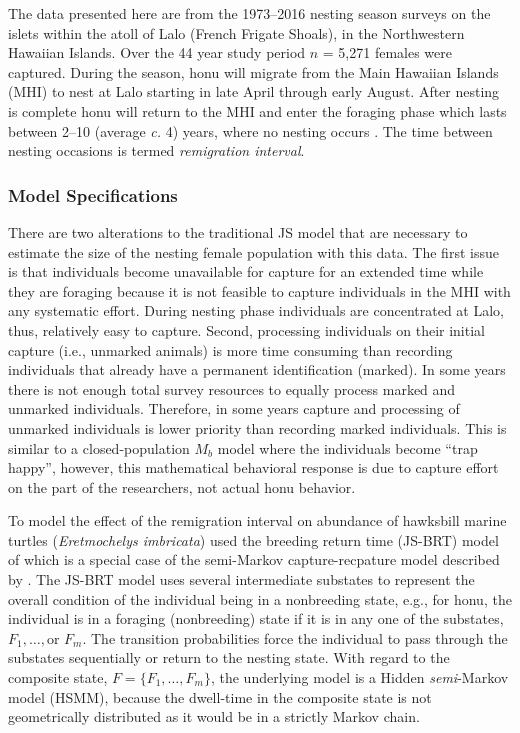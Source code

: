 \documentclass[12pt]{article}
\begin{document}
The data presented here are from the 1973--2016 nesting season surveys on the islets within the atoll of Lalo (French Frigate Shoals), in the Northwestern Hawaiian Islands. Over the 44 year study period $n$ = 5,271 females were captured. During the season, honu will migrate from the Main Hawaiian Islands (MHI) to nest at Lalo starting in late April through early August. After nesting is complete honu will return to the MHI and enter the foraging phase which lasts between 2--10 (average {\it c.} 4) years, where no nesting occurs \citep{BalazsEtAl2015a}. The time between nesting occasions is termed {\it remigration interval}. 


\subsubsection{Model Specifications}

There are two alterations to the traditional JS model that are necessary to estimate the size of the nesting female population with this data. The first issue is that individuals become unavailable for capture for an extended time while they are foraging because it is not feasible to capture individuals in the MHI with any systematic effort. During nesting phase individuals are concentrated at Lalo, thus, relatively easy to capture. Second, processing individuals on their initial capture (i.e., unmarked animals) is more time consuming than recording individuals that already have a permanent identification (marked). In some years there is not enough total survey resources to equally process marked and unmarked individuals. Therefore, in some years capture and processing of unmarked individuals is lower priority than recording marked individuals. This is similar to a closed-population $M_b$ model \citep{OtisEtAl1978a} where the individuals become ``trap happy'', however, this mathematical behavioral response is due to capture effort on the part of the researchers, not actual honu behavior.

To model the effect of the remigration interval on abundance of hawksbill marine turtles ({\it Eretmochelys imbricata}) \citet{kendall2019multistate} used the breeding return time (JS-BRT) model of \cite{PledgerEtAl2013a} which is a special case of the semi-Markov capture-recpature model described by \cite{king2016semi}. The JS-BRT model uses several intermediate substates to represent the overall condition of the individual being in a nonbreeding state, e.g., for honu, the individual is in a foraging (nonbreeding) state if it is in any one of the substates, $F_1,\dots, \text{or } F_m$. The transition probabilities force the individual to pass through the substates sequentially or return to the nesting state. With regard to the composite state, $F=\{F_1,\dots,F_m\}$, the underlying model is a Hidden {\it semi}-Markov model (HSMM), because the dwell-time in the composite state is not geometrically distributed as it would be in a strictly Markov chain.
\end{document}
